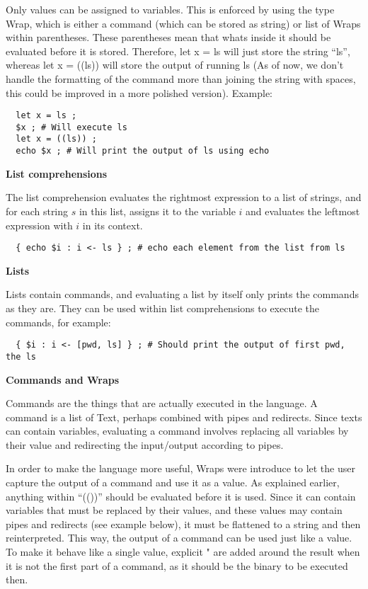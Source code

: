 \documentclass[11pt,a4paper]{article}
\begin{document}
Only values can be assigned to variables. This is enforced by using the type
Wrap, which is either a command (which can be stored as string) or list of
Wraps within parentheses. These parentheses mean that whats inside it should be
evaluated before it is stored. Therefore, let x = ls will just store the string
``ls'', whereas let x = ((ls)) will store the output of running ls (As of now,
we don't handle the formatting of the command more than joining the string with
spaces, this could be improved in a more polished version). Example:

\begin{verbatim}
  let x = ls ;
  $x ; # Will execute ls
  let x = ((ls)) ;
  echo $x ; # Will print the output of ls using echo
\end{verbatim}

\textbf{List comprehensions}

The list comprehension evaluates the rightmost expression to a list of strings,
and for each string $s$ in this list, assigns it to the variable $i$ and
evaluates the leftmost expression with $i$ in its context.

\begin{verbatim}
  { echo $i : i <- ls } ; # echo each element from the list from ls
\end{verbatim}

\textbf{Lists}

Lists contain commands, and evaluating a list by itself only prints the
commands as they are. They can be used within list comprehensions to execute
the commands, for example:

\begin{verbatim}
  { $i : i <- [pwd, ls] } ; # Should print the output of first pwd, the ls
\end{verbatim}

\textbf{Commands and Wraps}

Commands are the things that are actually executed in the language. A command
is a list of Text, perhaps combined with pipes and redirects. Since texts can
contain variables, evaluating a command involves replacing all variables by
their value and redirecting the input/output according to pipes.

In order to make the language more useful, Wraps were introduce to let the user
capture the output of a command and use it as a value. As explained earlier,
anything within ``(())'' should be evaluated before it is used. Since it can
contain variables that must be replaced by their values, and these values may
contain pipes and redirects (see example below), it must be flattened to a
string and then reinterpreted. This way, the output of a command can be used
just like a value. To make it behave like a single value, explicit " are added
around the result when it is not the first part of a command, as it should be
the binary to be executed then.
\end{document}
